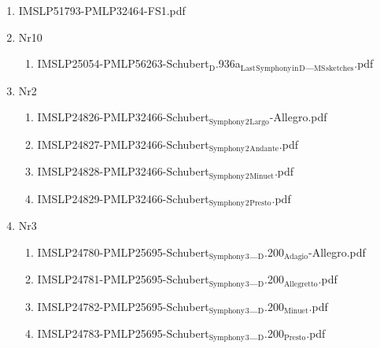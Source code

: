 \documentclass[11pt]{article}
\begin{document}
\begin{enumerate}
\begin{enumerate}
\item IMSLP51793-PMLP32464-FS1.pdf
\label{sec-1-1-1-1-44-60-5-3}

\item Nr10
\label{sec-1-1-1-1-44-60-5-4}
\begin{enumerate}
\item IMSLP25054-PMLP56263-Schubert$_{\text{D}}$.936a$_{\text{Last}}$$_{\text{Symphony}}$$_{\text{in}}$$_{\text{D}}$\_$_{\text{MS}}$$_{\text{sketches}}$.pdf
\label{sec-1-1-1-1-44-60-5-4-1}
\end{enumerate}

\item Nr2
\label{sec-1-1-1-1-44-60-5-5}
\begin{enumerate}
\item IMSLP24826-PMLP32466-Schubert$_{\text{Symphony}}$$_{\text{2}}$$_{\text{Largo}}$-Allegro.pdf
\label{sec-1-1-1-1-44-60-5-5-1}

\item IMSLP24827-PMLP32466-Schubert$_{\text{Symphony}}$$_{\text{2}}$$_{\text{Andante}}$.pdf
\label{sec-1-1-1-1-44-60-5-5-2}

\item IMSLP24828-PMLP32466-Schubert$_{\text{Symphony}}$$_{\text{2}}$$_{\text{Minuet}}$.pdf
\label{sec-1-1-1-1-44-60-5-5-3}

\item IMSLP24829-PMLP32466-Schubert$_{\text{Symphony}}$$_{\text{2}}$$_{\text{Presto}}$.pdf
\label{sec-1-1-1-1-44-60-5-5-4}
\end{enumerate}

\item Nr3
\label{sec-1-1-1-1-44-60-5-6}
\begin{enumerate}
\item IMSLP24780-PMLP25695-Schubert$_{\text{Symphony}}$$_{\text{3}}$\_$_{\text{D}}$.200$_{\text{Adagio}}$-Allegro.pdf
\label{sec-1-1-1-1-44-60-5-6-1}

\item IMSLP24781-PMLP25695-Schubert$_{\text{Symphony}}$$_{\text{3}}$\_$_{\text{D}}$.200$_{\text{Allegretto}}$.pdf
\label{sec-1-1-1-1-44-60-5-6-2}

\item IMSLP24782-PMLP25695-Schubert$_{\text{Symphony}}$$_{\text{3}}$\_$_{\text{D}}$.200$_{\text{Minuet}}$.pdf
\label{sec-1-1-1-1-44-60-5-6-3}

\item IMSLP24783-PMLP25695-Schubert$_{\text{Symphony}}$$_{\text{3}}$\_$_{\text{D}}$.200$_{\text{Presto}}$.pdf
\label{sec-1-1-1-1-44-60-5-6-4}
\end{enumerate}


\end{enumerate}
\end{enumerate}
\end{document}
